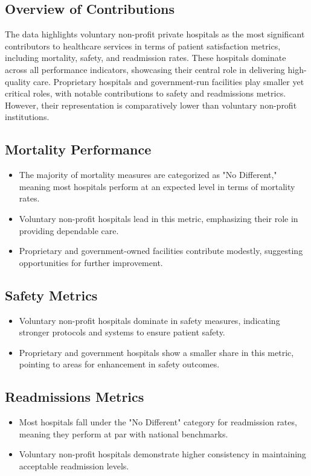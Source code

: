 \subsection{Overview of Contributions}
The data highlights voluntary non-profit private hospitals as the most significant contributors to healthcare services in terms of patient satisfaction metrics, including mortality, safety, and readmission rates. These hospitals dominate across all performance indicators, showcasing their central role in delivering high-quality care. Proprietary hospitals and government-run facilities play smaller yet critical roles, with notable contributions to safety and readmissions metrics. However, their representation is comparatively lower than voluntary non-profit institutions.

\subsection{Mortality Performance}
\begin{itemize}
    \item The majority of mortality measures are categorized as "No Different," meaning most hospitals perform at an expected level in terms of mortality rates.
    \item Voluntary non-profit hospitals lead in this metric, emphasizing their role in providing dependable care.
    \item Proprietary and government-owned facilities contribute modestly, suggesting opportunities for further improvement.
\end{itemize}

\subsection{Safety Metrics}
\begin{itemize}
    \item Voluntary non-profit hospitals dominate in safety measures, indicating stronger protocols and systems to ensure patient safety.
    \item Proprietary and government hospitals show a smaller share in this metric, pointing to areas for enhancement in safety outcomes.
\end{itemize}

\subsection{Readmissions Metrics}
\begin{itemize}
    \item Most hospitals fall under the "No Different" category for readmission rates, meaning they perform at par with national benchmarks.
    \item Voluntary non-profit hospitals demonstrate higher consistency in maintaining acceptable readmission levels.
\end{itemize}

